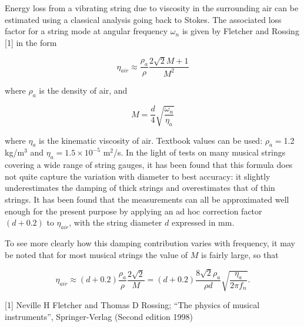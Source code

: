   Energy loss from a vibrating string due to viscosity in the surrounding air 
  can be estimated using a classical analysis going back to Stokes. The 
  associated loss factor for a string mode at angular frequency $\omega_n$ is 
  given by Fletcher and Rossing [1] in the form 

  \begin{equation*}\eta_{air} \approx \dfrac{\rho_a}{\rho} \dfrac{2 \sqrt{2} 
  M+1}{M^2} \tag{1}\end{equation*} 

  \noindent{}where $\rho_a$ is the density of air, and 

  \begin{equation*}M=\dfrac{d}{4} \sqrt{\dfrac{\omega_n}{\eta_a}} 
  \tag{2}\end{equation*} 

  \noindent{}where $\eta_a$ is the kinematic viscosity of air. Textbook values 
  can be used: $\rho_a = $1.2 kg/m$^3$ and $\eta_a = 1.5\times 10^{-5}$ 
  m$^2$/s. In the light of tests on many musical strings covering a wide range 
  of string gauges, it has been found that this formula does not quite capture 
  the variation with diameter to best accuracy: it slightly underestimates the 
  damping of thick strings and overestimates that of thin strings. It has been 
  found that the measurements can all be approximated well enough for the 
  present purpose by applying an ad hoc correction factor $(d+0.2)$ to 
  $\eta_{air}$, with the string diameter $d$ expressed in mm. 

  To see more clearly how this damping contribution varies with frequency, it 
  may be noted that for most musical strings the value of $M$ is fairly large, 
  so that 

  \begin{equation*}\eta_{air} \approx (d+0.2) \dfrac{\rho_a}{\rho} \dfrac{2 
  \sqrt{2}}{M} = (d+0.2) \dfrac{8 \sqrt{2} \rho_a}{\rho d} 
  \sqrt{\dfrac{\eta_a}{2 \pi f_n}} . \tag{3}\end{equation*} 

  \sectionreferences{}[1] Neville H Fletcher and Thomas D Rossing; ``The 
  physics of musical instruments'', Springer-Verlag (Second edition 1998) 